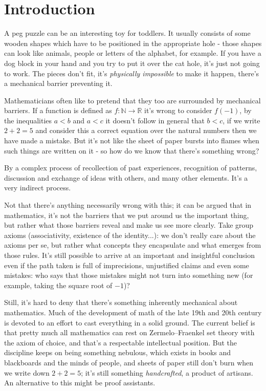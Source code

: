 \documentclass[oneside]{book}
\theoremstyle{definition}
\theoremstyle{remark}
\theoremstyle{plain}
\newcommand{\NN}{\mathbb{N}}
\newcommand{\RR}{\mathbb{R}}
\begin{document}
\tableofcontents

\mainmatter

\newpage

\chapter*{Introduction}


A peg puzzle can be an interesting toy for toddlers.
It usually consists of some wooden shapes which have to be
positioned in the appropriate hole - those shapes can look like animals, people or letters of the alphabet, for example.
If you have a dog block in your hand and you try to put it over the cat hole,
it's just not going to work. The pieces don't fit, it's \textit{physically impossible} to make it happen,
there's a mechanical barrier preventing it.

Mathematicians often like to pretend that they too are surrounded by mechanical barriers.
If a function is defined as $f : \NN \to \RR$ it's wrong to consider $f(-1)$,
by the inequalities $a < b$ and $a < c$ it doesn't follow in general that $b < c$,
if we write $2 + 2 = 5$ and consider this a correct equation over the natural numbers then we have made a mistake.
But it's not like the sheet of paper bursts into flames when such things are written on it -
so how do we know that there's something wrong?

By a complex process of recollection of past experiences, recognition of patterns,
discussion and exchange of ideas with others, and many other elements.
It's a very indirect process.

Not that there's anything necessarily wrong with this;
it can be argued that in mathematics, it's not the barriers that we put around us the important thing,
but rather what those barriers reveal and make us see more clearly.
Take group axioms (associativity, existence of the identity...): we don't really care about the axioms per se,
but rather what concepts they encapsulate and what emerges from those rules.
It's still possible to arrive at an important and insightful conclusion even if the path taken
is full of imprecisions, unjustified claims and even some mistakes:
who says that those mistakes might not turn into something new (for example, taking the square root of $-1$)?

Still, it's hard to deny that there's something inherently mechanical about mathematics.
Much of the development of math of the late 19th and 20th century is devoted to an effort to
cast everything in a solid ground. The current belief is that pretty much all mathematics can rest on Zermelo–Fraenkel set theory
with the axiom of choice, and that's a respectable intellectual position.
But the discipline keeps on being something nebulous, which exists in books and blackboards and the minds of people,
and sheets of paper still don't burn when we write down $2 + 2 = 5$; it's still something \textit{handcrafted}, a product of artisans.
\newpage
An alternative to this might be proof assistants.
\end{document}

